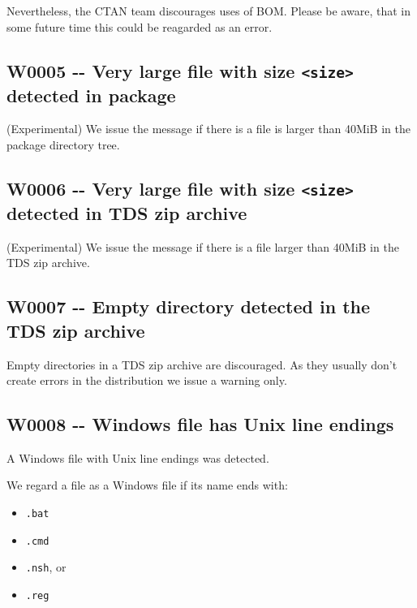 Nevertheless, the CTAN team discourages uses of BOM. Please be aware,
that in some future time this could be reagarded as an error.

\hypertarget{w0005----very-large-file--with-size-size-detected-in-package}{%
\subsection{\texorpdfstring{W0005 -\/- Very large file with size
\texttt{\textless{}size\textgreater{}} detected in
package}{W0005 -\/- Very large file  with size \textless size\textgreater{} detected in package}}\label{w0005----very-large-file--with-size-size-detected-in-package}}

(Experimental) We issue the message if there is a file is larger than
40MiB in the package directory tree.

\hypertarget{w0006----very-large-file-with-size-size-detected-in-tds-zip-archive}{%
\subsection{\texorpdfstring{W0006 -\/- Very large file with size
\texttt{\textless{}size\textgreater{}} detected in TDS zip
archive}{W0006 -\/- Very large file with size \textless size\textgreater{} detected in TDS zip archive}}\label{w0006----very-large-file-with-size-size-detected-in-tds-zip-archive}}

(Experimental) We issue the message if there is a file larger than 40MiB
in the TDS zip archive.

\hypertarget{w0007----empty-directory-detected-in-the-tds-zip-archive}{%
\subsection{W0007 -\/- Empty directory detected in the TDS zip
archive}\label{w0007----empty-directory-detected-in-the-tds-zip-archive}}

Empty directories in a TDS zip archive are discouraged. As they usually
don't create errors in the distribution we issue a warning only.

\hypertarget{w0008----windows-file-has-unix-line-endings}{%
\subsection{W0008 -\/- Windows file has Unix line
endings}\label{w0008----windows-file-has-unix-line-endings}}

A Windows file with Unix line endings was detected.

We regard a file as a Windows file if its name ends with:

\begin{itemize}
\tightlist
\item
  \texttt{.bat}
\item
  \texttt{.cmd}
\item
  \texttt{.nsh}, or
\item
  \texttt{.reg}
\end{itemize}
